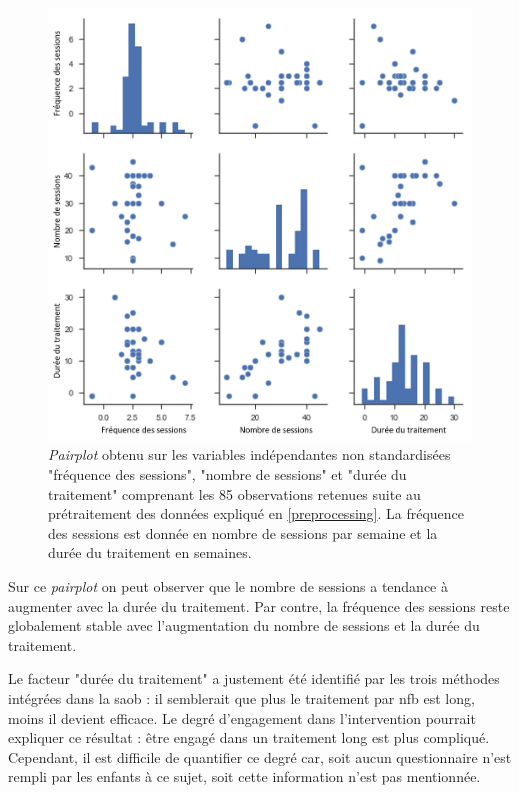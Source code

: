 \begin{figure}[h!]
  \centering
	\includegraphics[width=1\linewidth]{figures/chapter-3/factors-pairplot} 
  \caption[\textit{Pairplot} obtenu sur les variables indépendantes non standardisées.]{\textit{Pairplot} obtenu sur les variables indépendantes non standardisées "fréquence des sessions", "nombre de sessions" et "durée du traitement" 
	comprenant les 85 observations retenues suite au prétraitement des données expliqué en \ref{preprocessing}. La fréquence des sessions 
	est donnée en nombre de sessions par semaine et la durée du traitement en semaines.}
  \label{Figure:factors_pairplot}
\end{figure}

Sur ce \textit{pairplot} on peut observer que le nombre de sessions a tendance à augmenter avec la durée du traitement. Par contre, 
la fréquence des sessions reste globalement stable avec l'augmentation du nombre de sessions et la durée du traitement. 

Le facteur "durée du traitement" a justement été identifié par les trois méthodes intégrées dans la \gls{saob} : il semblerait que plus le traitement par 
\gls{nfb} est long, moins il devient efficace. Le degré d'engagement 
dans l'intervention pourrait expliquer ce résultat : être engagé dans un traitement long est plus compliqué. Cependant, il est difficile de quantifier ce degré car, 
soit aucun questionnaire n'est rempli par les enfants à ce sujet, soit cette information n'est pas mentionnée. 

